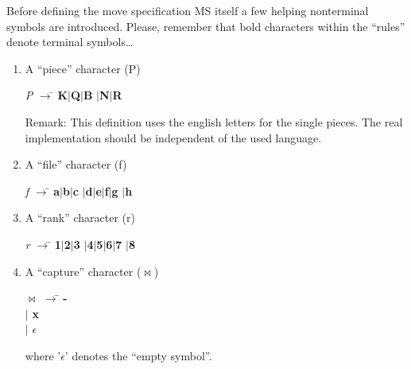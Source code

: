 \documentclass[a4paper]{article}
\def\abbrev#1{\textsf{#1}}
\def\bnf#1{\textit{#1}}
\def\bnfterm#1{\textbf{#1}}
\def\bnfprod{$\rightarrow$}
\def\bnfempty{$\epsilon$}
\def\bnfor{$|$}
\def\bnfjoin{$\bowtie$}
\begin{document}
Before defining the move specification \abbrev{MS} itself a few helping nonterminal
symbols are introduced. Please, remember that bold characters within
the ``rules'' denote terminal symbols\ldots

\begin{enumerate}
\item A ``piece'' character (\abbrev{P})

\begin{center}
\begin{minipage}{3cm}
\begin{tabbing}
\bnf{P} \bnfprod\={} \bnfterm{K}\bnfor\bnfterm{Q}\bnfor\bnfterm{B}%
\bnfor\bnfterm{N}\bnfor\bnfterm{R}
\end{tabbing}
\end{minipage}
\end{center}

Remark: This definition uses the english letters for the single pieces. The
real implementation should be independent of the used language.

\item A ``file'' character (\abbrev{f})

\begin{center}
\begin{minipage}{5cm}
\begin{tabbing}
\bnf{f} \bnfprod\={} \bnfterm{a}\bnfor\bnfterm{b}\bnfor\bnfterm{c}%
\bnfor\bnfterm{d}\bnfor\bnfterm{e}\bnfor\bnfterm{f}\bnfor\bnfterm{g}%
\bnfor\bnfterm{h}
\end{tabbing}
\end{minipage}
\end{center}

\item A ``rank'' character (\abbrev{r})

\begin{center}
\begin{minipage}{3cm}
\begin{tabbing}
\bnf{r} \bnfprod\={} \bnfterm{1}\bnfor\bnfterm{2}\bnfor\bnfterm{3}%
\bnfor\bnfterm{4}\bnfor\bnfterm{5}\bnfor\bnfterm{6}\bnfor\bnfterm{7}%
\bnfor\bnfterm{8}
\end{tabbing}
\end{minipage}
\end{center}

\item A ``capture'' character (\bnfjoin)

\begin{center}
\begin{minipage}{3cm}
\begin{tabbing}
\bnfjoin{} \bnfprod\={} \bnfterm{-}\\
 \>\bnfor{} \bnfterm{x}\\
 \>\bnfor{} \bnfempty
\end{tabbing}
\end{minipage}
\end{center}

where '\bnfempty' denotes the ``empty symbol''.

\end{enumerate}
\end{document}
